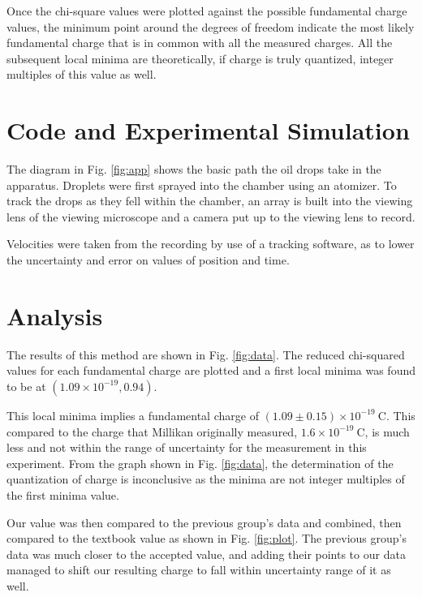 \documentclass[%
 reprint,
 amsmath,amssymb,
 aps,
]{revtex4-2}
\begin{document}
Once the chi-square values were plotted against the possible fundamental charge values, the minimum point around the degrees of freedom indicate the most likely fundamental charge that is in common with all the measured charges. All the subsequent local minima are theoretically, if charge is truly quantized, integer multiples of this value as well.

\section{Code and Experimental Simulation}


The diagram in Fig. \ref{fig:app} shows the basic path the oil drops take in the apparatus. Droplets were first sprayed into the chamber using an atomizer. To track the drops as they fell within the chamber, an array is built into the viewing lens of the viewing microscope and a camera put up to the viewing lens to record.

Velocities were taken from the recording by use of a tracking software, as to lower the uncertainty and error on values of position and time. 

\section{Analysis}

The results of this method are shown in Fig. \ref{fig:data}. The reduced chi-squared values for each fundamental charge are plotted and a first local minima was found to be at $(1.09\times10^{-19}, 0.94)$. 

This local minima implies a fundamental charge of $(1.09\pm 0.15)\times10^{-19} \ \mathrm{C}$. This compared to the charge that Millikan originally measured, $1.6 \times 10^{-19} \ \mathrm{C}$, is much less and not within the range of uncertainty for the measurement in this experiment. From the graph shown in Fig. \ref{fig:data}, the determination of the quantization of charge is inconclusive as the minima are not integer multiples of the first minima value.

Our value was then compared to the previous group's data and combined, then compared to the textbook value as shown in Fig. \ref{fig:plot}. The previous group's data was much closer to the accepted value, and adding their points to our data managed to shift our resulting charge to fall within uncertainty range of it as well.
\end{document}
